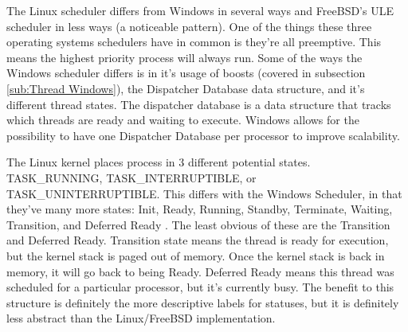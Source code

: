 \par The Linux scheduler differs from Windows in several ways and FreeBSD's ULE scheduler in less ways (a noticeable pattern).
One of the things these three operating systems schedulers have in common is they're all preemptive.
This means the highest priority process will always run.
Some of the ways the Windows scheduler differs is in it's usage of boosts (covered in subsection \ref{sub:Thread Windows}), the Dispatcher Database data structure, and it's different thread states.
The dispatcher database is a data structure that tracks which threads are ready and waiting to execute.
Windows allows for the possibility to have one Dispatcher Database per processor to improve scalability.

\par The Linux kernel places process in 3 different potential states. TASK\_RUNNING, TASK\_INTERRUPTIBLE, or TASK\_UNINTERRUPTIBLE.
This differs with the Windows Scheduler, in that they've many more states: Init, Ready, Running, Standby, Terminate, Waiting, Transition, and Deferred Ready \cite{win:1}.
The least obvious of these are the Transition and Deferred Ready.
Transition state means the thread is ready for execution, but the kernel stack is paged out of memory.
Once the kernel stack is back in memory, it will go back to being Ready.
Deferred Ready means this thread was scheduled for a particular processor, but it's currently busy.
The benefit to this structure is definitely the more descriptive labels for statuses, but it is definitely less abstract than the Linux/FreeBSD implementation.
